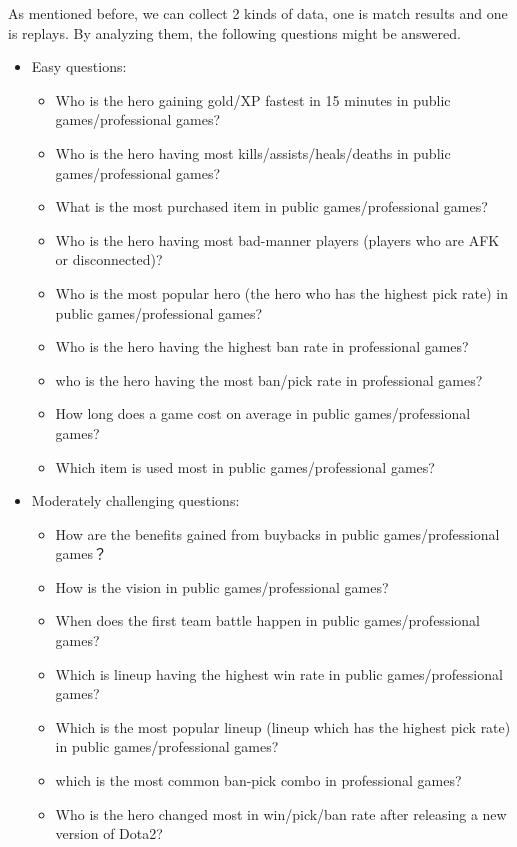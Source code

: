 \documentclass{article}
\begin{document}
As mentioned before, we can collect 2 kinds of data, one is match results and one is replays.
By analyzing them, the following questions might be answered.

\begin{itemize}
    \item Easy questions:
    \begin{itemize}
        \item Who is the hero gaining gold/XP fastest in 15 minutes in public games/professional games?
        \item Who is the hero having most kills/assists/heals/deaths in public games/professional games?
        \item What is the most purchased item in public games/professional games?
        \item Who is the hero having most bad-manner players (players who are AFK or disconnected)?
        \item Who is the most popular hero (the hero who has the highest pick rate) in public games/professional games?
        \item Who is the hero having the highest ban rate in professional games?
        \item who is the hero having the most ban/pick rate in professional games?
        \item How long does a game cost on average in public games/professional games?
        \item Which item is used most in public games/professional games?
    \end{itemize}
    \item Moderately challenging questions:
    \begin{itemize}
        \item How are the benefits gained from buybacks in public games/professional games？
        \item How is the vision in public games/professional games?
        \item When does the first team battle happen in public games/professional games?
        \item Which is lineup having the highest win rate in public games/professional games?
        \item Which is the most popular lineup (lineup which has the highest pick rate) in public games/professional games?
        \item which is the most common ban-pick combo in professional games?
        \item Who is the hero changed most in win/pick/ban rate after releasing a new version of Dota2?

\end{itemize}
\end{itemize}
\end{document}
